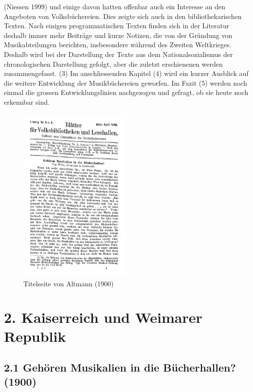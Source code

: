 \documentclass[a4paper,
fontsize=11pt,
oneside,
numbers=noperiodatend,
parskip=half-,
bibliography=totoc,
final
]{scrartcl}
\begin{document}
(Niessen 1999) und einige davon hatten offenbar auch ein Interesse an
den Angeboten von Volksbüchereien. Dies zeigte sich auch in den
bibliothekarischen Texten. Nach einigen programmatischen Texten finden
sich in der Literatur deshalb immer mehr Beiträge und kurze Notizen, die
von der Gründung von Musikabteilungen berichten, insbesondere während
des Zweiten Weltkrieges. Deshalb wird bei der Darstellung der Texte aus
dem Nationalsozialismus der chronologischen Darstellung gefolgt, aber
die zuletzt erschienenen werden zusammengefasst. (3) Im anschliessenden
Kapitel (4) wird ein kurzer Ausblick auf die weitere Entwicklung der
Musikbüchereien geworfen. Im Fazit (5) werden noch einmal die grossen
Entwicklungslinien nachgezogen und gefragt, ob sie heute noch erkennbar
sind.

\begin{figure}
\centering
\includegraphics[width=0.5\textwidth]{files/Altmann_1900.jpg}
\caption{Titelseite von Altmann (1900)}
\end{figure}

\hypertarget{kaiserreich-und-weimarer-republik}{%
\section{2. Kaiserreich und Weimarer
Republik}\label{kaiserreich-und-weimarer-republik}}

\hypertarget{gehuxf6ren-musikalien-in-die-buxfccherhallen-1900}{%
\subsection{2.1 Gehören Musikalien in die Bücherhallen?
(1900)}\label{gehuxf6ren-musikalien-in-die-buxfccherhallen-1900}}
\end{document}
